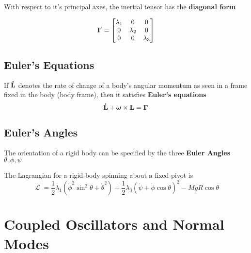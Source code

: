 \documentclass{article}
\DeclareMathOperator{\Lagr}{\mathcal{L}}
\begin{document}
With respect to it's principal axes, the inertial tensor has the \textbf{diagonal form}

$$
\vb{I'} = \begin{bmatrix}
    \lambda_1 & 0 & 0 \\
    0 & \lambda_2 & 0 \\
    0 & 0 & \lambda_3 \\
  \end{bmatrix}
$$
\subsection*{Euler's Equations}
If $\vb{\dot{L}}$ denotes the rate of change of a body's angular momentum as seen in a frame fixed in the body (body frame), then it satisfies \textbf{Euler's equations}
$$
\vb{\dot{L}} + \bm \omega \times \vb{L} = \bm \Gamma
$$
\subsection*{Euler's Angles}
The orientation of a rigid body can be specified by the three \textbf{Euler Angles} $\theta, \phi, \psi$ 

The Lagrangian for a rigid body spinning about a fixed pivot is
$$
\Lagr = \frac{1}{2} \lambda_1 (\dot\phi^2 \sin^2\theta + \dot\theta^2) + \frac{1}{2} \lambda_3(\dot\psi + \dot\phi \cos\theta)^2 - M g R \cos\theta
$$

\section{Coupled Oscillators and Normal Modes}
\end{document}

